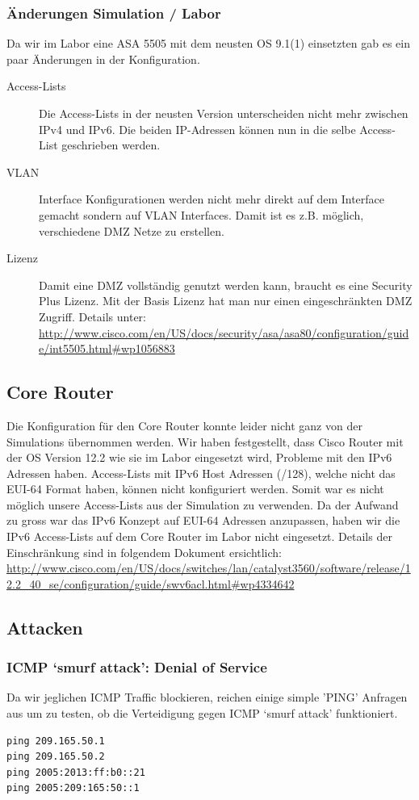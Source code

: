 \documentclass[11pt,a4paper,parskip=half]{scrartcl}
\begin{document}
\subsubsection{Änderungen Simulation / Labor}
Da wir im Labor eine ASA 5505 mit dem neusten OS 9.1(1) einsetzten gab es ein paar Änderungen in der Konfiguration.
\begin{description}
	\item[Access-Lists] Die Access-Lists in der neusten Version unterscheiden nicht mehr zwischen IPv4 und IPv6. Die beiden IP-Adressen können nun in die selbe Access-List geschrieben werden. 
	\item[VLAN] Interface Konfigurationen werden nicht mehr direkt auf dem Interface gemacht sondern auf VLAN Interfaces. Damit ist es z.B. möglich, verschiedene DMZ Netze zu erstellen.
	\item[Lizenz] Damit eine DMZ vollständig genutzt werden kann, braucht es eine Security Plus Lizenz. Mit der Basis Lizenz hat man nur einen eingeschränkten DMZ Zugriff. Details unter: \url{http://www.cisco.com/en/US/docs/security/asa/asa80/configuration/guide/int5505.html#wp1056883}
\end{description}

\subsection{Core Router}
Die Konfiguration für den Core Router konnte leider nicht ganz von der Simulations übernommen werden. Wir haben festgestellt, dass Cisco Router mit der OS Version 12.2 wie sie im Labor eingesetzt wird, Probleme mit den IPv6 Adressen haben. Access-Lists mit IPv6 Host Adressen (/128), welche nicht das EUI-64 Format haben, können nicht konfiguriert werden. Somit war es nicht möglich unsere Access-Lists aus der Simulation zu verwenden. Da der Aufwand zu gross war das IPv6 Konzept auf EUI-64 Adressen anzupassen, haben wir die IPv6 Access-Lists auf dem Core Router im Labor nicht eingesetzt. Details der Einschränkung sind in folgendem Dokument ersichtlich: \url{http://www.cisco.com/en/US/docs/switches/lan/catalyst3560/software/release/12.2_40_se/configuration/guide/swv6acl.html#wp4334642}

\subsection{Attacken}
\subsubsection{ICMP ‘smurf attack’: Denial of Service}
Da wir jeglichen ICMP Traffic blockieren, reichen einige simple 'PING' Anfragen aus um zu testen, ob die Verteidigung gegen ICMP ‘smurf attack’ funktioniert.
\begin{lstlisting}
ping 209.165.50.1
ping 209.165.50.2
ping 2005:2013:ff:b0::21
ping 2005:209:165:50::1
\end{lstlisting}
\end{document}
